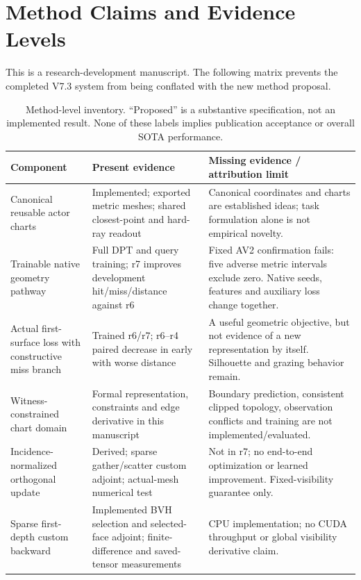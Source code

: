 \section{Method Claims and Evidence Levels}
\label{app:claims}
This is a research-development manuscript. The following matrix prevents the completed V7.3 system from being conflated with the new method proposal.
\begin{table}[h]
\centering\small
\begin{tabular}{p{}p{}p{}}
\toprule
Component & Present evidence & Missing evidence / attribution limit\\\midrule
Canonical reusable actor charts & Implemented; exported metric meshes; shared closest-point and hard-ray readout & Canonical coordinates and charts are established ideas; task formulation alone is not empirical novelty.\\
Trainable native geometry pathway & Full DPT and query training; r7 improves development hit/miss/distance against r6 & Fixed AV2 confirmation fails: five adverse metric intervals exclude zero. Native seeds, features and auxiliary loss change together.\\
Actual first-surface loss with constructive miss branch & Trained r6/r7; r6--r4 paired decrease in early with worse distance & A useful geometric objective, but not evidence of a new representation by itself. Silhouette and grazing behavior remain.\\
Witness-constrained chart domain & Formal representation, constraints and edge derivative in this manuscript & Boundary prediction, consistent clipped topology, observation conflicts and training are not implemented/evaluated.\\
Incidence-normalized orthogonal update & Derived; sparse gather/scatter custom adjoint; actual-mesh numerical test & Not in r7; no end-to-end optimization or learned improvement. Fixed-visibility guarantee only.\\
Sparse first-depth custom backward & Implemented BVH selection and selected-face adjoint; finite-difference and saved-tensor measurements & CPU implementation; no CUDA throughput or global visibility derivative claim.\\
\bottomrule
\end{tabular}
\caption{Method-level inventory. ``Proposed'' is a substantive specification, not an implemented result. None of these labels implies publication acceptance or overall SOTA performance.}
\end{table}

